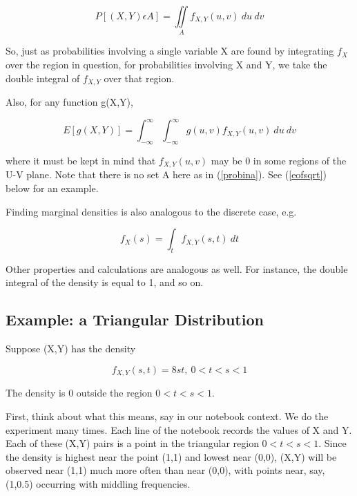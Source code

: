 \begin{equation}
\label{probina}
P[(X,Y) \epsilon A] 
= \iint \limits_A f_{X,Y} (u,v) ~ du ~ dv
\end{equation}

So, just as probabilities involving a single variable X are found by
integrating $f_X$ over the region in question, for probabilities
involving X and Y, we take the double integral of $f_{X,Y}$ over that
region.

Also, for any function g(X,Y), 

\begin{equation}
\label{meancontin}
E[g(X,Y)] 
= \int_{-\infty}^{\infty} \int_{-\infty}^{\infty} g(u,v) f_{X,Y} (u,v) ~ du ~ dv
\end{equation}

where it must be kept in mind that $f_{X,Y}(u,v)$ may be 0 in some
regions of the U-V plane.  Note that there is no set A here as in
(\ref{probina}).  See (\ref{eofsqrt}) below for an example.

Finding marginal densities is also analogous to the discrete case, e.g.

\begin{equation}
\label{contmarg}
f_X(s) = \int_{t} f_{X,Y} (s,t)  ~ dt
\end{equation}

Other properties and calculations are analogous as well.  For instance,
the double integral of the density is equal to 1, and so on.

\subsection{Example: a Triangular Distribution}
\label{8st}

Suppose (X,Y) has the density 

\begin{equation}
\label{tridens}
f_{X,Y}(s,t) = 8st, ~ 0 < t < s < 1
\end{equation}

The density is 0 outside the region $0 < t < s < 1$.

First, think about what this means, say in our notebook context.  We do
the experiment many times.  Each line of the notebook records the values
of X and Y.  Each of these (X,Y) pairs is a point in the triangular region
$0 < t < s < 1$.  Since the density is highest near the point (1,1) and
lowest near (0,0), (X,Y) will be observed near (1,1) much more often
than near (0,0), with points near, say, (1,0.5) occurring with middling
frequencies.  

